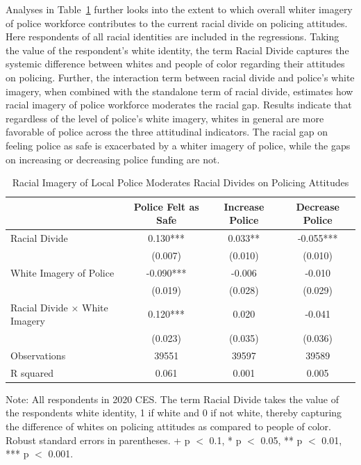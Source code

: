 \documentclass[
  12pt,
]{article}
\begin{document}
Analyses in Table~\ref{tbl-divides} further looks into the extent to
which overall whiter imagery of police workforce contributes to the
current racial divide on policing attitudes. Here respondents of all
racial identities are included in the regressions. Taking the value of
the respondent's white identity, the term Racial Divide captures the
systemic difference between whites and people of color regarding their
attitudes on policing. Further, the interaction term between racial
divide and police's white imagery, when combined with the standalone
term of racial divide, estimates how racial imagery of police workforce
moderates the racial gap. Results indicate that regardless of the level
of police's white imagery, whites in general are more favorable of
police across the three attitudinal indicators. The racial gap on
feeling police as safe is exacerbated by a whiter imagery of police,
while the gaps on increasing or decreasing police funding are not.

\hypertarget{tbl-divides}{}
\begin{table}
\caption{\label{tbl-divides}Racial Imagery of Local Police Moderates Racial Divides on Policing
Attitudes }\tabularnewline

\centering
\begin{threeparttable}
\begin{tabular}[t]{lccc}
\toprule
  & Police Felt as Safe & Increase Police & Decrease Police\\
\midrule
Racial Divide & 0.130*** & 0.033** & -0.055***\\
 & (0.007) & (0.010) & (0.010)\\
White Imagery of Police & -0.090*** & -0.006 & -0.010\\
 & (0.019) & (0.028) & (0.029)\\
Racial Divide × White Imagery & 0.120*** & 0.020 & -0.041\\
 & (0.023) & (0.035) & (0.036)\\
\midrule
Observations & 39551 & 39597 & 39589\\
R squared & 0.061 & 0.001 & 0.005\\
\bottomrule
\end{tabular}
\begin{tablenotes}
\item Note: All respondents in 2020 CES. The term Racial Divide takes the value of the respondents white identity, 1 if white and 0 if not white, thereby capturing the difference of whites on policing attitudes as compared to people of color. Robust standard errors in parentheses. + p $<$ 0.1, * p $<$ 0.05, ** p $<$ 0.01, *** p $<$ 0.001.
\end{tablenotes}
\end{threeparttable}
\end{table}
\end{document}
